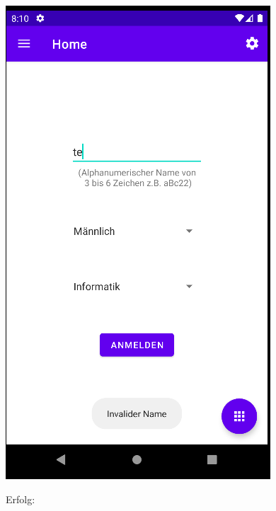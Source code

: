 \documentclass[ngerman]{tutorial}
\begin{document}
\begin{center}
    \includegraphics[scale=0.45]{reg_succ.png}
\end{center}
\begin{center}
    Erfolg:
\end{center}
\end{document}
